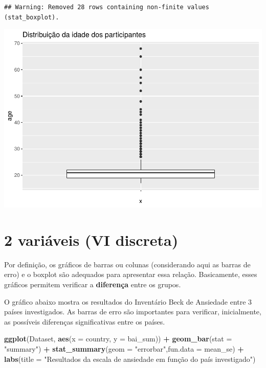\documentclass[
]{book}
\newenvironment{Shaded}{\begin{snugshade}}{\end{snugshade}}
\newcommand{\DataTypeTok}[1]{\textcolor[rgb]{0.13,0.29,0.53}{#1}}
\newcommand{\KeywordTok}[1]{\textcolor[rgb]{0.13,0.29,0.53}{\textbf{#1}}}
\newcommand{\NormalTok}[1]{#1}
\newcommand{\OperatorTok}[1]{\textcolor[rgb]{0.81,0.36,0.00}{\textbf{#1}}}
\newcommand{\StringTok}[1]{\textcolor[rgb]{0.31,0.60,0.02}{#1}}
\begin{document}
\begin{verbatim}
## Warning: Removed 28 rows containing non-finite values (stat_boxplot).
\end{verbatim}

\includegraphics{gitbook-demo_files/figure-latex/unnamed-chunk-18-1.pdf}

\hypertarget{variuxe1veis-vi-discreta}{%
\section{2 variáveis (VI discreta)}\label{variuxe1veis-vi-discreta}}

Por definição, os gráficos de barras ou colunas (considerando aqui as barras de erro) e o boxplot são adequados para apresentar essa relação. Basicamente, esses gráficos permitem verificar a \textbf{diferença} entre os grupos.

O gráfico abaixo mostra os resultados do Inventário Beck de Ansiedade entre 3 países investigados. As barras de erro são importantes para verificar, inicialmente, as possíveis diferenças significativas entre os países.

\begin{Shaded}
\begin{Highlighting}[]
\KeywordTok{ggplot}\NormalTok{(Dataset, }\KeywordTok{aes}\NormalTok{(}\DataTypeTok{x =}\NormalTok{ country, }\DataTypeTok{y =}\NormalTok{ bai_sum)) }\OperatorTok{+}
\StringTok{  }\KeywordTok{geom_bar}\NormalTok{(}\DataTypeTok{stat =} \StringTok{"summary"}\NormalTok{) }\OperatorTok{+}
\StringTok{  }\KeywordTok{stat_summary}\NormalTok{(}\DataTypeTok{geom =} \StringTok{"errorbar"}\NormalTok{,}\DataTypeTok{fun.data =}\NormalTok{ mean_se) }\OperatorTok{+}
\StringTok{  }\KeywordTok{labs}\NormalTok{(}\DataTypeTok{title =} \StringTok{"Resultados da escala de ansiedade em função do país investigado"}\NormalTok{)}
\end{Highlighting}
\end{Shaded}
\end{document}
